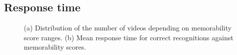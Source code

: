 \documentclass[sigconf]{acmart}
\begin{document}
\subsection{Response time}
\begin{figure}[!htbp]
	\centering
	\quad
	\quad
	\caption{\label{fig:response_time_vs_memorability}(a) Distribution of the number of videos depending on memorability score ranges. (b) Mean response time for correct recognitions against memorability scores.}
\end{figure}
\end{document}
